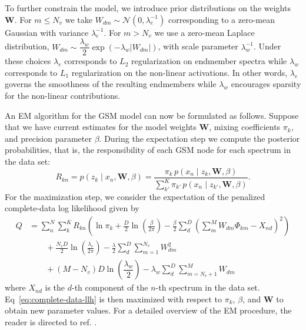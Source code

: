 \documentclass[remotesensing,article,submit,pdftex,moreauthors]{Definitions/mdpi}
\begin{document}
To further constrain the model, we introduce prior distributions on the weights $\mathbf{W}$. For $m\leq N_v$ we take $W_{dm}\sim\mathcal{N}(0, \lambda_e^{-1})$ corresponding to a zero-mean Gaussian with variance $\lambda_e^{-1}$. For $m>N_v$ we use a zero-mean Laplace distribution, $W_{dm}\sim\dfrac{\lambda_w}{2}\exp(-\lambda_w\lvert W_{dm}\rvert)$, with scale parameter $\lambda_w^{-1}$. Under these choices $\lambda_e$ corresponds to $L_2$ regularization on endmember spectra while $\lambda_w$ corresponds to $L_1$ regularization on the non-linear activations. In other words, $\lambda_e$ governs the smoothness of the resulting endmembers while $\lambda_w$ encourages sparsity for the non-linear contributions.

An EM algorithm for the GSM model can now be formulated as follows. Suppose that we have current estimates for the model weights $\mathbf{W}$, mixing coefficients $\pi_k$, and precision parameter $\beta$. During the expectation step we compute the posterior probabilities, that is, the responsibility of each GSM node for each spectrum in the data set:
\begin{equation}\label{eq:responsibility}
    R_{kn}  = p(z_k \mid x_n, \mathbf{W}, \beta) = \dfrac{\pi_k \, p(x_n \mid z_k, \mathbf{W}, \beta)}{\sum\limits_{k'}^K \pi_{k'} \, p(x_n \mid z_{k'}, \mathbf{W}, \beta)}.
\end{equation}
For the maximization step, we consider the expectation of the penalized complete-data log likelihood given by
\begin{equation}\label{eq:complete-data-llh}
\begin{aligned}
    Q &= \sum_n^N\sum_k^K R_{kn} \left(\ln\pi_k + \frac{D}{2}\ln\left(\frac{\beta}{2\pi}\right) - \frac{\beta}{2}\sum_d^D\left(\sum_m^M W_{dm}\Phi_{km} - X_{nd}\right)^2\right) \\ 
    &\qquad + \frac{N_vD}{2}\ln\left(\frac{\lambda_e}{2\pi}\right) - \frac{\lambda}{2}\sum_d^D \sum_{m=1}^{N_v} W_{dm}^2  \\ 
    &\qquad + (M-N_v)D\ln\left(\dfrac{\lambda_w}{2}\right) - \lambda_w\sum_d^D\sum_{m=N_v+1}^{M} W_{dm}
\end{aligned}
\end{equation}
where $X_{nd}$ is the $d$-th component of the $n$-th spectrum in the data set. Eq~\ref{eq:complete-data-llh} is then maximized with respect to $\pi_k$, $\beta$, and $\mathbf{W}$ to obtain new parameter values. For a detailed overview of the EM procedure, the reader is directed to ref. \cite{bishop-prml}.
\end{document}
